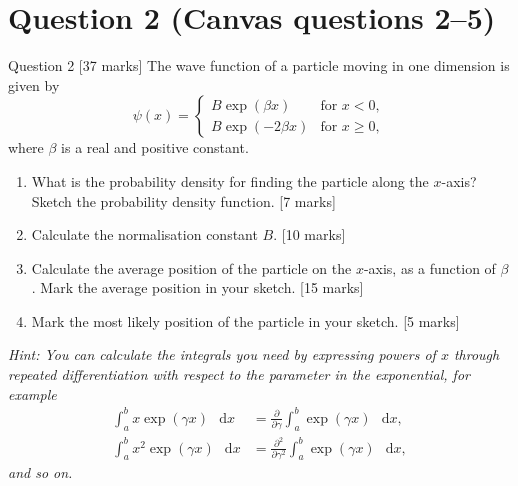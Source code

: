 \documentclass[12pt]{article}
\renewcommand{\d}{\mathop{}\!\mathrm{d}}
\begin{document}
\section{Question 2 (Canvas questions 2--5)}
\begin{problembox}{Question 2 \hfill [37 marks]}
The wave function of a particle moving in one dimension is given by
\[
    \psi(x) = \begin{cases}
        B \exp(\beta x) & \text{for } x<0,\\
        B \exp(-2\beta x) & \text{for } x \ge 0,
    \end{cases}
\]
where \(\beta\) is a real and positive constant.

\begin{enumerate}
    \item What is the probability density for finding the particle along the \(x\)-axis? Sketch the probability density function. \hfill [7 marks]
    \item Calculate the normalisation constant \(B\). \hfill [10 marks]
    \item Calculate the average position of the particle on the \(x\)-axis, as a function of \(\beta\). Mark the average position in your sketch. \hfill [15 marks]
    \item Mark the most likely position of the particle in your sketch. \hfill [5 marks]
\end{enumerate}

\textit{Hint: You can calculate the integrals you need by expressing powers of \(x\) through repeated differentiation with respect to the parameter in the exponential, for example}
\begin{align*}
    \int_a^b x \exp(\gamma x)\,\d x
    &= \frac{\partial}{\partial \gamma} \int_a^b \exp(\gamma x)\,\d x, \\
    \int_a^b x^2 \exp(\gamma x)\,\d x
    &= \frac{\partial^2}{\partial \gamma^2} \int_a^b \exp(\gamma x)\,\d x,
\end{align*}
\textit{and so on.}
\end{problembox}
\end{document}
